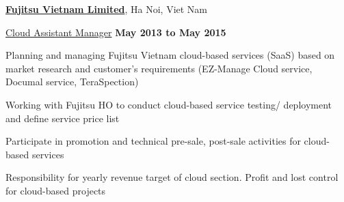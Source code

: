 \documentclass[10pt]{article}
\renewcommand\textit[1]{\underline{#1}}
\newcommand{\halfblankline}{\quad\vspace{-0.5\baselineskip}\pagebreak[3]}
\begin{document}
\href{http://fujitsu.com/vn/en/}{\textbf{Fujitsu Vietnam Limited}}, Ha Noi, Viet Nam
\begin{outerlist}

    \item[] \textit{Cloud Assistant Manager}%
            \hfill \textbf{May 2013 to May 2015}\\
            \begin{innerlist}

                \item Planning and managing  Fujitsu Vietnam  cloud-based  services (SaaS) based  on market  research and customer's requirements  (EZ-Manage  Cloud  service,   Documal  service, TeraSpection)

                \item Working  with  Fujitsu HO  to  conduct  cloud-based  service  testing/ deployment  and  define service  price  list

                \item  Participate  in  promotion and  technical pre-sale, post-sale  activities  for  cloud-based  services

	     \item  Responsibility for yearly revenue target of cloud section.  Profit and lost control for cloud-based  projects

            \end{innerlist}

\end{outerlist}

\halfblankline
\end{document}

